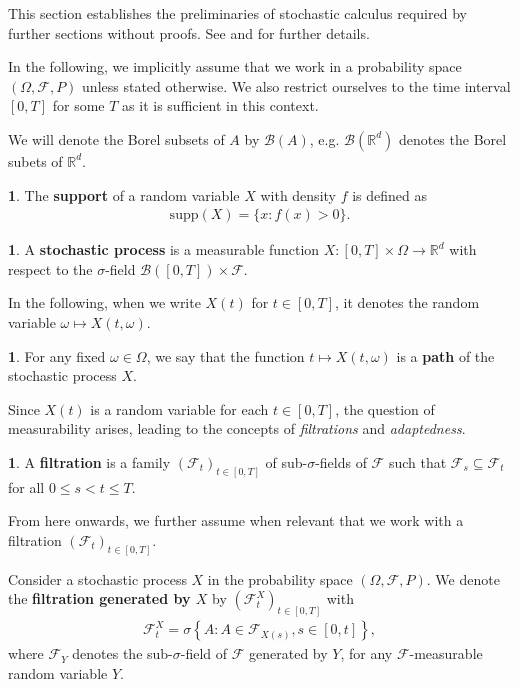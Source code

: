 \documentclass[english]{article}
\numberwithin{equation}{section}
\numberwithin{figure}{section}
\theoremstyle{bolddescit}
\theoremstyle{definition}
\newtheorem{definition}[theorem]{\protect\definitionname}
\theoremstyle{definition}
\theoremstyle{plain}
\theoremstyle{plain}
\theoremstyle{bolddesc}
\theoremstyle{plain}
\theoremstyle{remark}
\providecommand{\definitionname}{Definition}
\begin{document}
This section establishes the preliminaries of stochastic calculus required by further sections without proofs. See \textcite{capinski_stochastic_2012} and \textcite{capinski_blackscholes_2012} for further details.

In the following, we implicitly assume that we work in a probability space $(\Omega, \mathcal{F}, P)$ unless stated otherwise. We also restrict ourselves to the time interval $[0,T]$ for some $T$ as it is sufficient in this context.

We will denote the Borel subsets of $A$ by $\mathcal{B}(A)$, e.g. $\mathcal{B}(\mathbb{R}^d)$ denotes the Borel subets of $\mathbb{R}^d$.

\begin{definition}
  The \textbf{support} of a random variable $X$ with density $f$ is defined as
  \begin{align*}
    \mathrm{supp}(X) = \{x : f(x) > 0\}.
  \end{align*}
\end{definition}

\begin{definition}
  A \textbf{stochastic process} is a measurable function $X : [0,T] \times \Omega \to \mathbb{R}^d$ with respect to the $\sigma$-field $\mathcal{B}([0,T]) \times \mathcal{F}$.
\end{definition}

In the following, when we write $X(t)$ for $t \in [0,T]$, it denotes the random variable $\omega \mapsto X(t, \omega)$.

\begin{definition}
  For any fixed $\omega \in \Omega$, we say that the function $t \mapsto X(t,\omega)$ is a \textbf{path} of the stochastic process $X$.
\end{definition}

Since $X(t)$ is a random variable for each $t \in [0,T]$, the question of measurability arises, leading to the concepts of \textit{filtrations} and \textit{adaptedness}.

\begin{definition}
  A \textbf{filtration} is a family $(\mathcal{F}_t)_{t \in [0,T]}$ of sub-$\sigma$-fields of $\mathcal{F}$ such that $\mathcal{F}_s \subseteq \mathcal{F}_t$ for all $0 \le s < t \le T$.
\end{definition}

From here onwards, we further assume when relevant that we work with a filtration $(\mathcal{F}_t)_{t \in [0,T]}$.

Consider a stochastic process $X$ in the probability space $(\Omega, \mathcal{F}, P)$. We denote the \textbf{filtration generated by $X$} by $(\mathcal{F}^X_t)_{t \in [0,T]}$ with
\begin{align*}
  \mathcal{F}^X_t = \sigma \left\{ A : A \in \mathcal{F}_{X(s)}, s \in [0,t] \right\},
\end{align*}
where $\mathcal{F}_{Y}$ denotes the sub-$\sigma$-field of $\mathcal{F}$ generated by $Y$, for any $\mathcal{F}$-measurable random variable $Y$.
\end{document}
